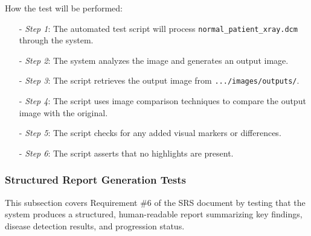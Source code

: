\documentclass[12pt, titlepage]{article}
\begin{document}
\begin{enumerate}
How the test will be performed:
\begin{itemize}
\item[-] \textit{Step 1}: The automated test script will process \texttt{normal\_patient\_xray.dcm} through the system.
\item[-] \textit{Step 2}: The system analyzes the image and generates an output image.
\item[-] \textit{Step 3}: The script retrieves the output image from \texttt{.../images/outputs/}.
\item[-] \textit{Step 4}: The script uses image comparison techniques to compare the output image with the original.
\item[-] \textit{Step 5}: The script checks for any added visual markers or differences.
\item[-] \textit{Step 6}: The script asserts that no highlights are present.
\end{itemize}
\end{enumerate}

\subsubsection{Structured Report Generation Tests}

This subsection covers Requirement \#6 of the SRS document by testing that the system produces a structured, human-readable report summarizing key findings, disease detection results, and progression status.
\end{document}
